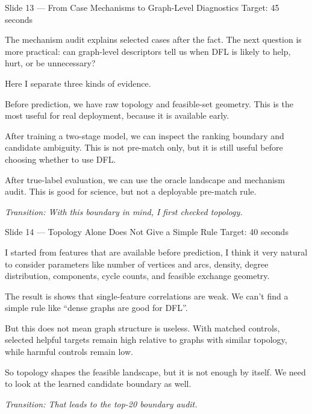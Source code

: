 \documentclass[11pt,aspectratio=169]{beamer}
\newcommand{\tr}[1]{\vspace{0.35em}\textit{\textcolor{black!55}{Transition: #1}}}
\newcommand{\timing}[1]{\textcolor{black!45}{\scriptsize Target: #1}\par\vspace{0.25em}}
\begin{document}
\begin{frame}{Slide 13 \enspace\textmd{\small\textcolor{black!40}{--- From Case Mechanisms to Graph-Level Diagnostics}}}
\small
\timing{45 seconds}

The mechanism audit explains selected cases after the fact. The next question is more practical: can graph-level descriptors tell us when DFL is likely to help, hurt, or be unnecessary?

\vspace{0.35em}
Here I separate three kinds of evidence.

\vspace{0.35em}
Before prediction, we have raw topology and feasible-set geometry. This is the most useful for real deployment, because it is available early.

\vspace{0.35em}
After training a two-stage model, we can inspect the ranking boundary and candidate ambiguity. This is not pre-match only, but it is still useful before choosing whether to use DFL.

\vspace{0.35em}
After true-label evaluation, we can use the oracle landscape and mechanism audit. This is good for science, but not a deployable pre-match rule.

\tr{With this boundary in mind, I first checked topology.}
\end{frame}

\begin{frame}{Slide 14 \enspace\textmd{\small\textcolor{black!40}{--- Topology Alone Does Not Give a Simple Rule}}}
\small
\timing{40 seconds}

I started from features that are available before prediction, I think it very natural to consider parameters like number of vertices and arcs, density, degree distribution, components, cycle counts, and feasible exchange geometry.

\vspace{0.35em}
The result is shows that single-feature correlations are weak. We can't find a simple rule like ``dense graphs are good for DFL''.

\vspace{0.35em}
But this does not mean graph structure is useless. With matched controls, selected helpful targets remain high relative to graphs with similar topology, while harmful controls remain low.

\vspace{0.35em}
So topology shapes the feasible landscape, but it is not enough by itself. We need to look at the learned candidate boundary as well.

\tr{That leads to the top-20 boundary audit.}
\end{frame}
\end{document}
